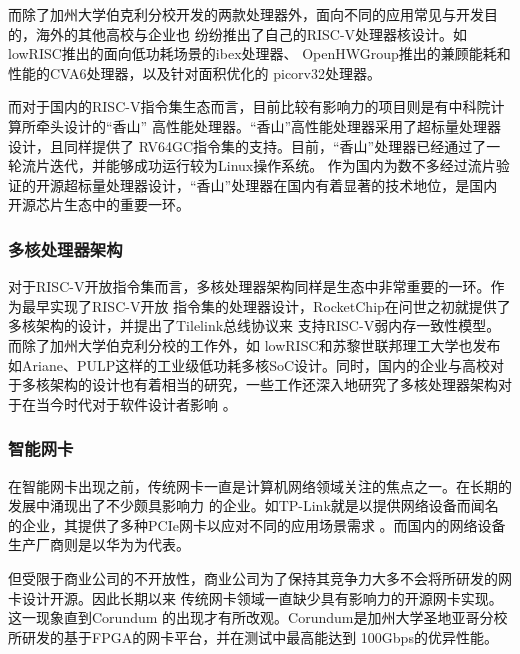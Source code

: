 而除了加州大学伯克利分校开发的两款处理器外，面向不同的应用常见与开发目的，海外的其他高校与企业也
纷纷推出了自己的RISC-V处理器核设计。如lowRISC推出的面向低功耗场景的ibex处理器\cite{lowrisc_ibex}、
OpenHWGroup推出的兼顾能耗和性能的CVA6处理器\cite{zaruba2019cost}，以及针对面积优化的
picorv32处理器\cite{picorv32}。

而对于国内的RISC-V指令集生态而言，目前比较有影响力的项目则是有中科院计算所牵头设计的“香山”
高性能处理器\cite{xiangshan_riscv}。“香山”高性能处理器采用了超标量处理器设计，且同样提供了
RV64GC指令集的支持。目前，“香山”处理器已经通过了一轮流片迭代，并能够成功运行较为Linux操作系统。
作为国内为数不多经过流片验证的开源超标量处理器设计，“香山”处理器在国内有着显著的技术地位，是国内
开源芯片生态中的重要一环。

\subsubsection{多核处理器架构}

对于RISC-V开放指令集而言，多核处理器架构同样是生态中非常重要的一环。作为最早实现了RISC-V开放
指令集的处理器设计，RocketChip在问世之初就提供了多核架构的设计，并提出了Tilelink总线协议来
支持RISC-V弱内存一致性模型\cite{asanovic2016rocket}。而除了加州大学伯克利分校的工作外，如
lowRISC和苏黎世联邦理工大学也发布如Ariane、PULP这样的工业级低功耗多核SoC设计\cite{balkind2019openpiton+,
rossi2017energy}。同时，国内的企业与高校对于多核架构的设计也有着相当的研究\cite{manycore2013fudan,
gs464e2015recent}，一些工作还深入地研究了多核处理器架构对于在当今时代对于软件设计者影响
\cite{manycoretime2016recent}。

\subsubsection{智能网卡}
\label{section:present_smartnic}

在智能网卡出现之前，传统网卡一直是计算机网络领域关注的焦点之一。在长期的发展中涌现出了不少颇具影响力
的企业。如TP-Link就是以提供网络设备而闻名的企业，其提供了多种PCIe网卡以应对不同的应用场景需求
\cite{tplink_website}。而国内的网络设备生产厂商则是以华为为代表\cite{huawei_website}。

但受限于商业公司的不开放性，商业公司为了保持其竞争力大多不会将所研发的网卡设计开源。因此长期以来
传统网卡领域一直缺少具有影响力的开源网卡实现。这一现象直到Corundum\cite{forencich2020corundum}
的出现才有所改观。Corundum是加州大学圣地亚哥分校所研发的基于FPGA的网卡平台，并在测试中最高能达到
100Gbps的优异性能。

